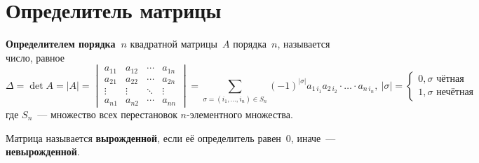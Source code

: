 \section{Определитель матрицы}
 \textbf{Определителем порядка~$n$} квадратной {матрицы~$A$} порядка~$n$, называется число, равное
\begin{equation}
\label{eq:determinant}
\Delta = \det A = |A| =
\begin{vmatrix}
a_{11} & a_{12} & \cdots & a_{1n} \\
a_{21} & a_{22} & \cdots & a_{2n} \\
\vdots & \vdots & \ddots & \vdots \\
a_{n1} & a_{n2} & \cdots & a_{nn}
\end{vmatrix} =
\sum_{\sigma = (i_1, \ldots, i_n) \in S_n} (-1)^{|\sigma|} a_{1\, i_1} a_{2\, i_2} \cdot \ldots \cdot a_{n\, i_n}, \ 
|\sigma| =
\begin{cases}
0, \sigma \text{ чётная} \\
1, \sigma \text{ нечётная}
\end{cases}
\end{equation}
где $S_n$~--- множество всех перестановок $n$-элементного множества.

Матрица называется \textbf{вырожденной}, если её определитель равен~$0$, иначе~--- \textbf{невырожденной}.

